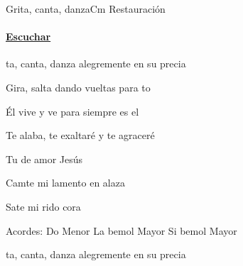 \documentclass[12pt, spanish]{book}
\newcommand{\NotCCLIed}{\relax}
\begin{document}
    \begin{song}{Grita, canta, danza}{Cm}
    {\SBPubDom} %
    {Restauraci\'on}
    {} %
    {} %
        \ifChordBk
            \paragraph{\mbox{}\hfill\protect\href{https://open.spotify.com/intl-es/track/0d6JXGfRFaabGaPQCnZcXA}{Escuchar}\mbox{}\hfill}
        \fi


        \begin{SBChorus}
            ta, canta, danza alegremente en su precia

            Gira, salta dando vueltas para to

            Él vive y ve para siempre es el 
        \end{SBChorus}


        \begin{SBOpGroup}
            Te alaba, te exaltaré y te agraceré

            Tu de amor Jesús

            Camte mi lamento en alaza

            Sate mi rido cora 
        \end{SBOpGroup}

        \ifChordBk
        \begin{SBOpGroup}
            Acordes:
            \upchord{\Cm}\qquad Do Menor \hfill
            \upchord{\Aflat}La bemol Mayor \hfill\null\break
            \upchord{\Bflat}\qquad Si bemol Mayor \hfill\null\break
        \end{SBOpGroup}
        \clearpage
        \fi
        \begin{SBExtraKeys}{


            \begin{SBChorus}
                ta, canta, danza alegremente en su precia


\end{SBChorus}}
\end{SBExtraKeys}
\end{song}
\end{document}
